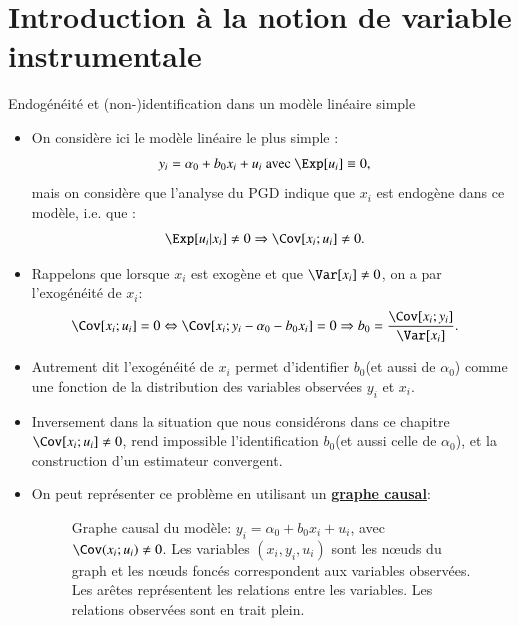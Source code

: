 \section{Introduction à la notion de variable instrumentale}
\frame{\sectionpage}
\begin{frame}[allowframebreaks]{Endogénéité et (non-)identification dans un modèle linéaire simple}
\begin{itemize}
\item On considère ici le modèle linéaire le plus simple :
\begin{align}
    y_i &=\alpha_0 +b_0x_i + u_i \  \text{avec} \ \Exp[u_i]\equiv 0,
    \label{eq1}
\end{align}
mais on considère que l’analyse du PGD indique que $x_i$ est endogène dans ce 
modèle, i.e. que :
\begin{align*}
\Exp[u_i| x_i]\neq 0 &\Rightarrow \Cov[x_i; u_i]\neq 0.
\end{align*}
\item Rappelons que lorsque $x_i$ est exogène et que $\Var[x_i] \neq 0$, on a par l'exogénéité de 
$x_i$:
\begin{align*}
    \Cov[x_i; u_i] = 0 &\Leftrightarrow \Cov[x_i; y_i - \alpha_0 -b_0x_i] =0
     \Rightarrow b_0 = \frac{\Cov[x_i; y_i]}{\Var[x_i]}.
\end{align*}
\item Autrement dit l'exogénéité de $x_i$ permet d'identifier $b_0$(et aussi de $\alpha_0$)
comme une fonction de la distribution des variables observées $y_i$ et $x_i$.
\item Inversement dans la situation que nous considérons dans ce chapitre  $\Cov[x_i; u_i]\neq 0$, 
rend impossible l'identification $b_0$(et aussi celle de $\alpha_0$), et 
la construction d'un estimateur convergent.

\framebreak

\item On peut représenter ce problème en utilisant un
\href{https://en.wikipedia.org/wiki/Causal\_graph}{\textbf{graphe causal}}: 

\begin{figure}[hbt!]
    \centering
          \caption{Graphe causal du modèle: $y_i = \alpha_0 + b_0x_i + u_i$, 
          avec $\Cov(x_i ; u_i)\neq 0$. Les variables
          $(x_i, y_i, u_i)$ sont les nœuds du graph et les 
           nœuds foncés correspondent aux variables observées.
          Les arêtes représentent les relations entre les variables. 
          Les relations observées sont en trait plein.}
    \label{fig1}
          \end{figure}
        \end{itemize}
\end{frame}

